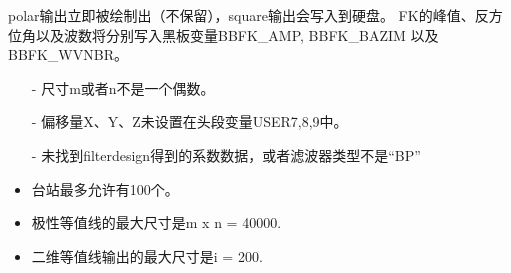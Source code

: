 polar输出立即被绘制出（不保留），square输出会写入到硬盘。
FK的峰值、反方位角以及波数将分别写入黑板变量BBFK\_AMP, BBFK\_BAZIM 以及BBFK\_WVNBR。

\begin{itemize}
\item[-]尺寸m或者n不是一个偶数。
\item[-]偏移量X、Y、Z未设置在头段变量USER7,8,9中。
\item[-]未找到filterdesign得到的系数数据，或者滤波器类型不是``BP''
\end{itemize}

\begin{itemize}
\item 台站最多允许有100个。
\item 极性等值线的最大尺寸是m x n = 40000.
\item 二维等值线输出的最大尺寸是i = 200.
\end{itemize}

